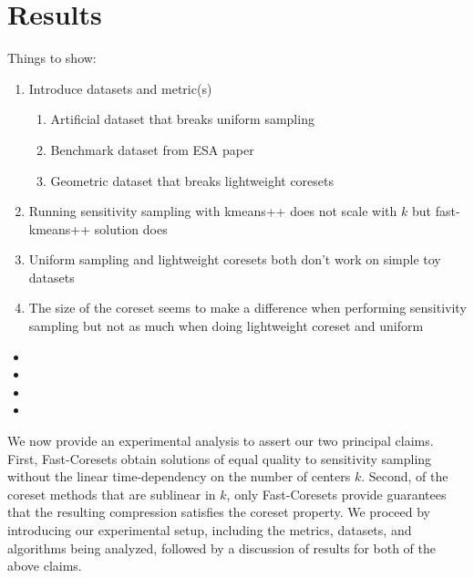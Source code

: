\section{Results}
Things to show:
\begin{enumerate}
    \item Introduce datasets and metric(s)
    \begin{enumerate}
        \item Artificial dataset that breaks uniform sampling
        \item Benchmark dataset from ESA paper
        \item Geometric dataset that breaks lightweight coresets
    \end{enumerate}
    \item Running sensitivity sampling with kmeans++ does not scale with $k$ but fast-kmeans++ solution does
    \item Uniform sampling and lightweight coresets both don't work on simple toy datasets
    \item The size of the coreset seems to make a difference when performing sensitivity sampling but not as much
          when doing lightweight coreset and uniform
\end{enumerate}

\begin{itemize}
\item {}
\item {}
\item {}
\item {}
\end{itemize}

We now provide an experimental analysis to assert our two principal claims. First, Fast-Coresets obtain solutions of equal quality to sensitivity sampling
without the linear time-dependency on the number of centers $k$. Second, of the coreset methods that are sublinear in $k$, only Fast-Coresets provide guarantees
that the resulting compression satisfies the coreset property. We proceed by introducing our experimental setup, including the metrics, datasets, and algorithms
being analyzed, followed by a discussion of results for both of the above claims.

